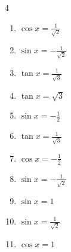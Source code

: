 \begin{multicols}{4}
\begin{enumerate}

  \item $\displaystyle \cos{x}  = \frac{1}{\sqrt{2}}$


  \item $\displaystyle \sin{x}  = -\frac{1}{\sqrt{2}}$


\columnbreak %

  \item $\displaystyle \tan{x}  = \frac{1}{\sqrt{3}}$


  \item $\displaystyle \tan{x}  = \sqrt{3}$


  \item $\displaystyle \sin{x}  = -\frac{1}{2}$


  \item $\displaystyle \tan{x}  = \frac{1}{\sqrt{3}}$


  \item $\displaystyle \cos{x}  = -\frac{1}{2}$


  \item $\displaystyle \sin{x}  = -\frac{1}{\sqrt{2}}$


  \item $\displaystyle \sin{x}  = 1$


  \item $\displaystyle \sin{x}  = \frac{1}{\sqrt{2}}$


  \item $\displaystyle \cos{x}  = 1$


\end{enumerate}
\end{multicols}
